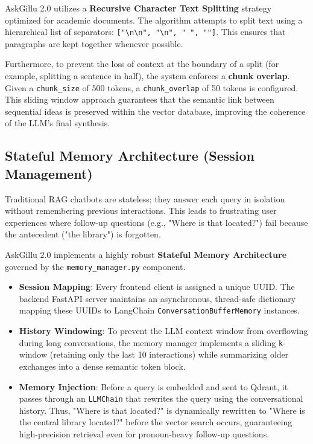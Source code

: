 \documentclass[12pt,a4paper]{report}
\begin{document}
AskGillu 2.0 utilizes a \textbf{Recursive Character Text Splitting} strategy optimized for academic documents. The algorithm attempts to split text using a hierarchical list of separators: \texttt{["\textbackslash n\textbackslash n", "\textbackslash n", " ", ""]}. This ensures that paragraphs are kept together whenever possible. 

Furthermore, to prevent the loss of context at the boundary of a split (for example, splitting a sentence in half), the system enforces a \textbf{chunk overlap}. Given a \texttt{chunk\_size} of 500 tokens, a \texttt{chunk\_overlap} of 50 tokens is configured. This sliding window approach guarantees that the semantic link between sequential ideas is preserved within the vector database, improving the coherence of the LLM's final synthesis.

\subsection{Stateful Memory Architecture (Session Management)}
Traditional RAG chatbots are stateless; they answer each query in isolation without remembering previous interactions. This leads to frustrating user experiences where follow-up questions (e.g., "Where is that located?") fail because the antecedent ("the library") is forgotten.

AskGillu 2.0 implements a highly robust \textbf{Stateful Memory Architecture} governed by the \texttt{memory\_manager.py} component. 
\begin{itemize}
    \item \textbf{Session Mapping}: Every frontend client is assigned a unique UUID. The backend FastAPI server maintains an asynchronous, thread-safe dictionary mapping these UUIDs to LangChain \texttt{ConversationBufferMemory} instances.
    \item \textbf{History Windowing}: To prevent the LLM context window from overflowing during long conversations, the memory manager implements a sliding \texttt{k}-window (retaining only the last 10 interactions) while summarizing older exchanges into a dense semantic token block.
    \item \textbf{Memory Injection}: Before a query is embedded and sent to Qdrant, it passes through an \texttt{LLMChain} that rewrites the query using the conversational history. Thus, "Where is that located?" is dynamically rewritten to "Where is the central library located?" before the vector search occurs, guaranteeing high-precision retrieval even for pronoun-heavy follow-up questions.
\end{itemize}
\end{document}
